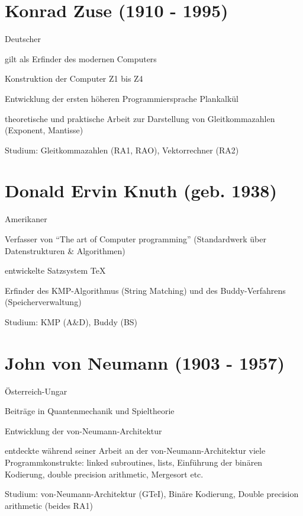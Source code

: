 \documentclass[a4paper,12pt]{report}
\begin{document}
\section*{Konrad Zuse (1910 - 1995)}
\begin{itemize*}
	\item Deutscher
	\item gilt als Erfinder des modernen Computers
	\item Konstruktion der Computer Z1 bis Z4
	\item Entwicklung der ersten höheren Programmiersprache Plankalkül
	\item theoretische und praktische Arbeit zur Darstellung von Gleitkommazahlen (Exponent, Mantisse)
	\item Studium: Gleitkommazahlen (RA1, RAO), Vektorrechner (RA2)
\end{itemize*}

\section*{Donald Ervin Knuth (geb. 1938)}
\begin{itemize*}
	\item Amerikaner
	\item Verfasser von ``The art of Computer programming'' (Standardwerk über Datenstrukturen \& Algorithmen)
	\item entwickelte Satzsystem TeX
	\item Erfinder des KMP-Algorithmus (String Matching) und des Buddy-Verfahrens (Speicherverwaltung)
	\item Studium: KMP (A\&D), Buddy (BS)
\end{itemize*}

\section*{John von Neumann (1903 - 1957)}
\begin{itemize*}
	\item Österreich-Ungar
	\item Beiträge in Quantenmechanik und Spieltheorie
	\item Entwicklung der von-Neumann-Architektur
	\item entdeckte während seiner Arbeit an der von-Neumann-Architektur viele Programmkonstrukte: linked subroutines, lists, Einführung der binären Kodierung, double precision arithmetic, Mergesort etc.
	\item Studium: von-Neumann-Architektur (GTeI), Binäre Kodierung, Double precision arithmetic (beides RA1)
\end{itemize*}
\end{document}
